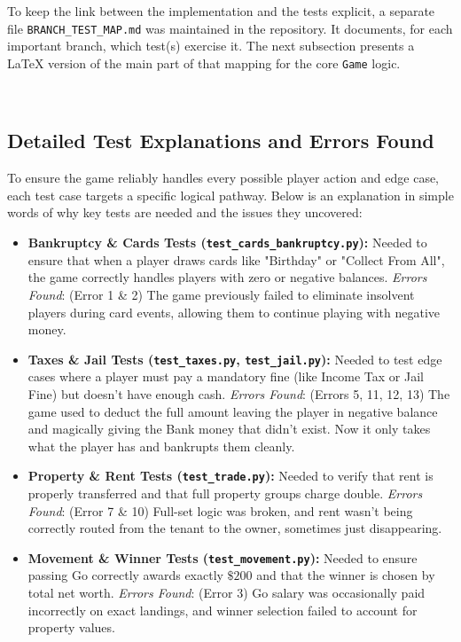 \documentclass[11pt]{article}
\begin{document}
To keep the link between the implementation and the tests explicit, a separate file \texttt{BRANCH\_TEST\_MAP.md} was maintained in the repository.  It documents, for each important branch, which test(s) exercise it.  The next subsection presents a LaTeX version of the main part of that mapping for the core \texttt{Game} logic.

\
\subsection*{Detailed Test Explanations and Errors Found}
To ensure the game reliably handles every possible player action and edge case, each test case targets a specific logical pathway. Below is an explanation in simple words of why key tests are needed and the issues they uncovered:

\begin{itemize}
    \item \textbf{Bankruptcy \& Cards Tests (\texttt{test\_cards\_bankruptcy.py}):} Needed to ensure that when a player draws cards like "Birthday" or "Collect From All", the game correctly handles players with zero or negative balances. \textit{Errors Found}: (Error 1 \& 2) The game previously failed to eliminate insolvent players during card events, allowing them to continue playing with negative money.
    
    \item \textbf{Taxes \& Jail Tests (\texttt{test\_taxes.py}, \texttt{test\_jail.py}):} Needed to test edge cases where a player must pay a mandatory fine (like Income Tax or Jail Fine) but doesn't have enough cash. \textit{Errors Found}: (Errors 5, 11, 12, 13) The game used to deduct the full amount leaving the player in negative balance and magically giving the Bank money that didn't exist. Now it only takes what the player has and bankrupts them cleanly.
    
    \item \textbf{Property \& Rent Tests (\texttt{test\_trade.py}):} Needed to verify that rent is properly transferred and that full property groups charge double. \textit{Errors Found}: (Error 7 \& 10) Full-set logic was broken, and rent wasn't being correctly routed from the tenant to the owner, sometimes just disappearing. 
    
    \item \textbf{Movement \& Winner Tests (\texttt{test\_movement.py}):} Needed to ensure passing Go correctly awards exactly $\$200$ and that the winner is chosen by total net worth. \textit{Errors Found}: (Error 3) Go salary was occasionally paid incorrectly on exact landings, and winner selection failed to account for property values.
    

\end{itemize}
\end{document}
